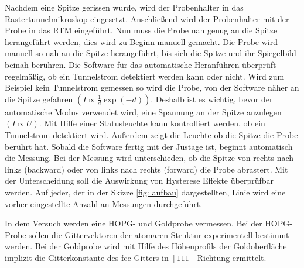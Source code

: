 Nachdem eine Spitze gerissen wurde, wird der Probenhalter in das Rastertunnelmikroskop eingesetzt.
Anschließend wird der Probenhalter mit der Probe in das RTM eingeführt.
Nun muss die Probe nah genug an die Spitze herangeführt werden, dies wird zu Beginn
manuell gemacht. Die Probe wird manuell so nah an die Spitze herangeführt, bis sich
die Spitze und ihr Spiegelbild beinah berühren. Die Software für das automatische
Heranführen überprüft regelmäßig, ob ein Tunnelstrom detektiert werden kann oder nicht. %
Wird zum Beispiel kein Tunnelstrom gemessen so wird die Probe, von der Software %
näher an die Spitze gefahren $\left(I\propto \frac{1}{d}\exp{(-d)}\right) $.
Deshalb ist es wichtig, bevor der automatische
Modus verwendet wird, eine Spannung an der Spitze anzulegen $\left(I\propto U\right)$. Mit Hilfe einer
Statusleuchte kann kontrolliert werden, ob ein Tunnelstrom detektiert wird. Außerdem zeigt die Leuchte
ob die Spitze die Probe berührt hat.
Sobald die Software fertig mit der Justage ist, beginnt automatisch die Messung.
Bei der Messung wird unterschieden, ob die Spitze von rechts nach links (backward) oder von links nach rechts (forward) %
die Probe abrastert. Mit der Unterscheidung soll die Auswirkung von Hysterese Effekte überprüfbar werden. %
Auf jeder, der in der Skizze \ref{fig: aufbau} dargestellten, Linie wird eine vorher eingestellte
Anzahl an Messungen durchgeführt.

In dem Versuch werden eine HOPG- und Goldprobe vermessen.
Bei der HOPG-Probe sollen die Gittervektoren der atomaren Struktur
experimentell bestimmt werden.
Bei der Goldprobe wird mit Hilfe des Höhenprofils der Goldoberfläche implizit
die Gitterkonstante des fcc-Gitters in $[111]$-Richtung ermittelt.
